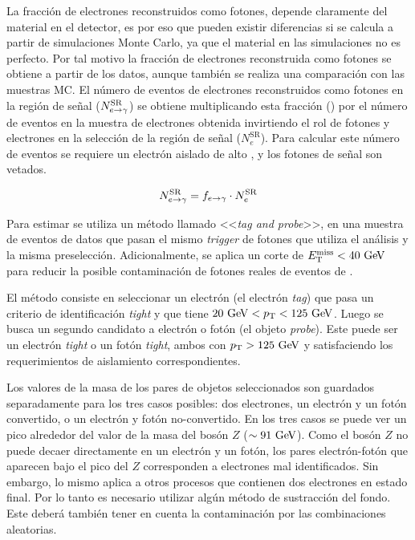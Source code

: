 La fracción de electrones reconstruidos como fotones, depende claramente del
material en el detector, es por eso que pueden existir diferencias si se calcula
a partir de simulaciones Monte Carlo, ya que el material en las simulaciones no
es perfecto. Por tal motivo la fracción de electrones reconstruida como fotones
se obtiene a partir de los datos, aunque también se realiza una comparación con las muestras MC.
El número de eventos de electrones reconstruidos como fotones en la región de
señal ($N_{e\rightarrow\gamma}^{\mathrm{SR}}$) se obtiene multiplicando esta fracción (\feg)
por el número de eventos en la muestra de electrones
obtenida invirtiendo el rol de fotones y electrones en la selección de la región
de señal ($N_e^{\mathrm{SR}}$). Para calcular este número de eventos se requiere
un electrón aislado de alto {\pt}, y los fotones de señal son
vetados.

\begin{equation}
  N_{e\rightarrow\gamma}^{\mathrm{SR}} = f_{e\rightarrow\gamma} \cdot N_e^{\mathrm{SR}}
\end{equation}

Para estimar {\feg} se utiliza un método llamado <<\emph{tag and probe}>>, en una muestra
de eventos de datos {\Zee} que pasan el mismo \emph{trigger} de fotones que utiliza el
análisis y la misma preselección. Adicionalmente, se
aplica un corte de $\met < 40 \gev$ para reducir la posible contaminación de
fotones reales de eventos de {\wgam}.

El método consiste en seleccionar un electrón (el electrón \emph{tag}) que
pasa un criterio de identificación \emph{tight} y que tiene $20 \gev < \pt < 125 \gev$.
Luego se busca un segundo candidato a electrón o fotón
(el objeto \emph{probe}). Este puede ser un electrón \emph{tight} o un fotón
\emph{tight}, ambos con $\pt > 125\gev$ y satisfaciendo los requerimientos de
aislamiento correspondientes.

Los valores de la masa de los pares de objetos seleccionados son guardados
separadamente para los tres casos posibles: dos electrones, un electrón y un
fotón convertido, o un electrón y fotón no-convertido. En los tres casos se
puede ver un pico alrededor del valor de la masa del bosón $Z$ ($\sim 91
\gev$).
Como el bosón $Z$ no puede decaer directamente en un electrón y un fotón, los
pares electrón-fotón que aparecen bajo el pico del $Z$ corresponden a electrones
mal identificados. Sin embargo, lo mismo aplica a otros procesos que contienen
dos electrones en estado final.
Por lo tanto es necesario utilizar algún método de
sustracción del fondo. Este deberá también tener en cuenta la contaminación por
las combinaciones aleatorias.

